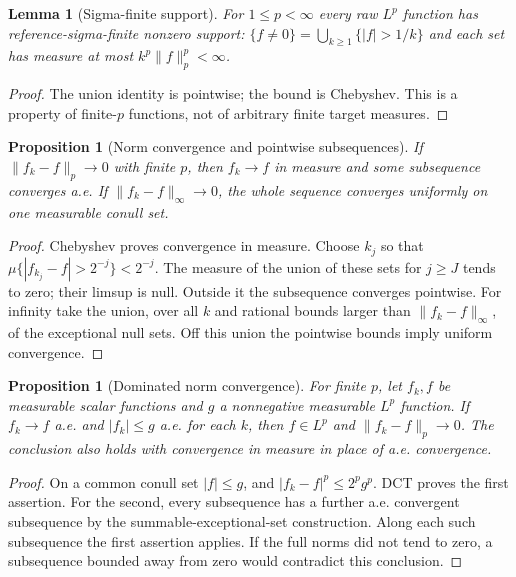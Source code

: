 \documentclass[11pt,oneside,openany]{book}
\newtheorem{lemma}[theorem]{Lemma}
\newtheorem{proposition}[theorem]{Proposition}
\theoremstyle{definition}
\theoremstyle{remark}
\newcommand{\family}[1]{}
\begin{document}
\begin{lemma}[Sigma-finite support]\family{D11.10.sigmafinite_support}\label{d11:10:sigmafinite-support}
For $1\leq p<\infty$ every raw $L^p$ function has reference-sigma-finite
nonzero support: $\{f\ne0\}=\bigcup_{k\geq1}\{|f|>1/k\}$ and each
set has measure at most $k^p\|f\|_p^p<\infty$.
\end{lemma}
\begin{proof}
The union identity is pointwise; the bound is Chebyshev. This is a property
of finite-$p$ functions, not of arbitrary finite target measures.
\end{proof}

\begin{proposition}[Norm convergence and pointwise subsequences]\family{D11.10.lp_convergence_measure}\label{d11:10:lp-convergence-measure}
If $\|f_k-f\|_p\to0$ with finite $p$, then $f_k\to f$ in measure and
some subsequence converges a.e. If $\|f_k-f\|_\infty\to0$, the whole
sequence converges uniformly on one measurable conull set.
\end{proposition}
\begin{proof}
Chebyshev proves convergence in measure. Choose $k_j$ so that
$\mu\{|f_{k_j}-f|>2^{-j}\}<2^{-j}$. The measure of the union of these
sets for $j\geq J$ tends to zero; their limsup is null. Outside it the
subsequence converges pointwise. For infinity take the union, over all $k$
and rational bounds larger than $\|f_k-f\|_\infty$, of the exceptional
null sets. Off this union the pointwise bounds imply uniform convergence.
\end{proof}

\begin{proposition}[Dominated norm convergence]\family{D11.10.dominated_lp}\label{d11:10:dominated-lp}
For finite $p$, let $f_k,f$ be measurable scalar functions and $g$ a
nonnegative measurable $L^p$ function. If $f_k\to f$ a.e. and
$|f_k|\leq g$ a.e. for each $k$, then
$f\in L^p$ and $\|f_k-f\|_p\to0$. The conclusion also holds with
convergence in measure in place of a.e. convergence.
\end{proposition}
\begin{proof}
On a common conull set $|f|\leq g$, and
$|f_k-f|^p\leq2^pg^p$. DCT proves the first assertion. For the second,
every subsequence has a further a.e. convergent subsequence by the
summable-exceptional-set construction. Along each such subsequence the
first assertion applies. If the full norms did not tend to zero, a
subsequence bounded away from zero would contradict this conclusion.
\end{proof}
\end{document}
